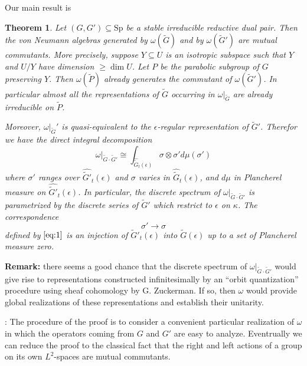 \documentclass[12pt]{amsart}
\newtheorem{thm}{Theorem}
\def\Sp{{\mathrm{Sp}}}
\def\tP{{\widetilde{P}}}
\def\tG{{\widetilde{G}}}
\def\htG{{\widetilde{G}}}
\def\kk{\kappa}
\begin{document}
Our main result is 

\begin{thm}\label{thm:1}
Let $(G,G')\subseteq \Sp$ be a stable irreducible reductive dual pair. 
Then the von Neumann algebras generated by $\omega(\tG)$ and by $\omega(\tG')$
are mutual commutants. 
More precisely, suppose $Y\subseteq U$ is an isotropic subspace such that
$Y$ and $U/ Y$ have dimension $\geq \dim U$. Let $P$ be 
the parabolic subgroup of $G$ preserving $Y$. 
Then $\omega(\tP)$ already generates the commutant of $\omega(\tG')$. 
In particular almost all the representations of $\tG$ 
occurring in $\omega|_\tG$ are already irreducible on $\tP$.

Moreover, $\omega|_\tG'$ is quasi-equivalent to the $\epsilon$-regular 
representation of $\tG'$. Therefor we have the direct integral decomposition
\begin{equation}\label{eq:1}
\omega|_{\tG\cdot\tG'}\cong \int_{\widehat{\tG}_t(\epsilon)}\sigma\otimes \sigma' 
d\mu(\sigma')
\end{equation}
where $\sigma'$ ranges over $\widehat{\tG'}_t(\epsilon)$ and $\sigma$
varies in $\widehat{\tG}_t(\epsilon)$, and $d\mu$ in Plancherel measure on 
$\widehat{\tG'}_t(\epsilon)$. In particular, the discrete spectrum of 
$\omega|_{\tG\cdot\tG'}$ is parametrized by the discrete series of $\tG'$
which restrict to $\epsilon$ on $\kk$. The correspondence
\[
\sigma'\to\sigma 
\]
defined by $\ref{eq:1}$ is an injection of $\htG'_t(\epsilon)$ 
into $\htG(\epsilon)$ up to a set of Plancherel measure zero.
\end{thm}

{\bf Remark:} there seems a good chance that the discrete spectrum of 
$\omega|_{\tG\cdot \tG'}$ would give rise to representations constructed 
infinitesimally by an ``orbit quantization'' procedure using sheaf cohomology 
by G. Zuckerman. If so, then $\omega$ would provide global realizations of
these representations and establish their unitarity.

\proof: The procedure of the proof is to consider a convenient particular
realization of $\omega$ in which the operators coming from
$G$ and $G'$ are easy to analyze. Eventrually we can reduce the proof to the
classical fact \cite{Dixmier1982} that the right and left actions of a 
group on its own $L^2$-spaces are mutual commutants.
\end{document}
